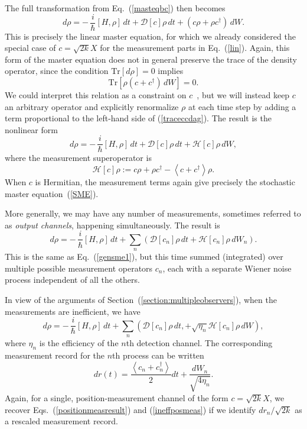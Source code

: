 \documentclass[aps,twocolumn,superscriptaddress,footinbib,floatfix,showpacs]{revtex4}
\def\expct#1{\!\left\langle{#1}\right\rangle}
\begin{document}
The full transformation from Eq.~(\ref{masteqbc}) then becomes
\begin{equation}
  d\rho = -\,\frac{i}{\hbar}[H,\rho]\,dt + \mathcal{D}[c]\rho \,dt
   + \left(c\rho+\rho c^\dagger\right)\, dW. 
\end{equation}
This is precisely the linear master equation, for which we already
considered the special case of $c=\sqrt{2k}X$ for the measurement
parts in Eq.~(\ref{lin}).
Again, this form of the master equation does not in general preserve the trace of the
density operator, since the condition $\mathrm{Tr}[d\rho]=0$ implies
\begin{equation}
  \mathrm{Tr}\left[\rho\left(c+c^\dagger\right)\,dW\right]=0.
  \label{traceccdag}
\end{equation}
We could interpret this relation as a constraint on $c$~\cite{Adler00}, 
but we will instead 
keep $c$ an arbitrary operator and explicitly renormalize
$\rho$ at each time step by adding a term proportional to the
left-hand side of (\ref{traceccdag}).
The result is the nonlinear form
\begin{equation}
  d\rho = -\,\frac{i}{\hbar}[H,\rho]\,dt + \mathcal{D}[c]\rho \,dt
   + \mathcal{H}[c]\rho\, dW,
   \label{gensme1}
\end{equation}
where the measurement superoperator is 
\begin{equation}
  \mathcal{H}[c]\rho := c\rho + \rho c^\dagger - \expct{c+c^\dagger}\rho.
\end{equation}
When $c$ is Hermitian, the measurement terms again give 
precisely the stochastic master equation~(\ref{SME}).

More generally, we may have any number of measurements, sometimes 
referred to as {\em output channels}, happening simultaneously. The result is 
\begin{equation}
  d\rho = -\,\frac{i}{\hbar}[H,\rho]\,dt + \sum_n \left(\mathcal{D}[c_n]\rho\,dt
   + \mathcal{H}[c_n]\rho\, dW_n\right).
\end{equation}
This is the same as Eq.~(\ref{gensme1}), but this time summed
(integrated) over multiple possible measurement operators $c_n$, each
with a separate Wiener noise process independent of all the others.  

In view of the arguments of Section~(\ref{section:multipleobservers}), when 
the measurements are inefficient, we have  
\begin{equation}
  d\rho = -\,\frac{i}{\hbar}[H,\rho]\,dt + \sum_n \left(\mathcal{D}[c_n]\rho\,dt,
   + \sqrt{\eta_n} \mathcal{H}[c_n]\rho\, dW\right), 
  \label{generalmasteqn}
\end{equation}
where $\eta_n$ is the efficiency of the $n$th detection channel.
The corresponding measurement record for the $n$th process
can be written
\begin{equation} 
  dr(t) = \frac{\expct{c_n+c_n^\dagger}}{2}dt + \frac{dW_n}{\sqrt{4 \eta_n}}.
\end{equation}
Again, for a single, position-measurement 
channel of the form $c=\sqrt{2k}X$, we recover  
Eqs.~(\ref{positionmeasresult}) and (\ref{ineffposmeas}) if we identify 
$dr_n/\sqrt{2k}$ as a rescaled measurement record.
\end{document}
